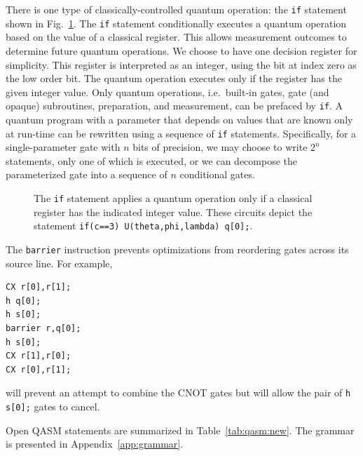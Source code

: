 \documentclass[USenglish,12pt,fleqn]{article} %
\newcommand*{\code}{\texttt}
\begin{document}
There is one type of classically-controlled quantum operation: the \code{if} statement shown in Fig.~\ref{fig:if}. The \code{if} statement conditionally executes a quantum operation based on the value of a classical register. This allows measurement outcomes to determine future quantum operations. We choose to have one decision register for simplicity. This register is interpreted as an integer, using the bit at index zero as the low order bit. The quantum operation executes only if the register has the given integer value. Only quantum operations, i.e.\ built-in gates, gate (and opaque) subroutines, preparation, and measurement, can be prefaced by \code{if}. A quantum program with a parameter that depends on values that are known only at run-time can be rewritten using a sequence of \code{if} statements. Specifically, for a single-parameter gate with $n$ bits of precision, we may choose to write $2^n$ statements, only one of which is executed, or we can decompose the parameterized gate into a sequence of $n$ conditional gates.

\begin{figure}
\centering
\begin{minipage}{.3\textwidth}
\centering

\end{minipage}
\begin{minipage}{.3\textwidth}
\centering
\end{minipage}
\caption{The \code{if} statement applies a quantum operation only if a classical register has the indicated integer value. These circuits depict the statement \code{if(c==3) U(theta,phi,lambda) q[0];}.
\label{fig:if}}
\end{figure}

The \code{barrier} instruction prevents optimizations from reordering gates across its source line. For example,
\begin{verbatim}
CX r[0],r[1]; 
h q[0]; 
h s[0];
barrier r,q[0];
h s[0]; 
CX r[1],r[0]; 
CX r[0],r[1];
\end{verbatim}
will prevent an attempt to combine the CNOT gates but will allow the pair of \code{h s[0];} gates to cancel.

Open QASM statements are summarized in Table~\ref{tab:qasm:new}. The grammar is presented in Appendix~\ref{app:grammar}.
\end{document}
